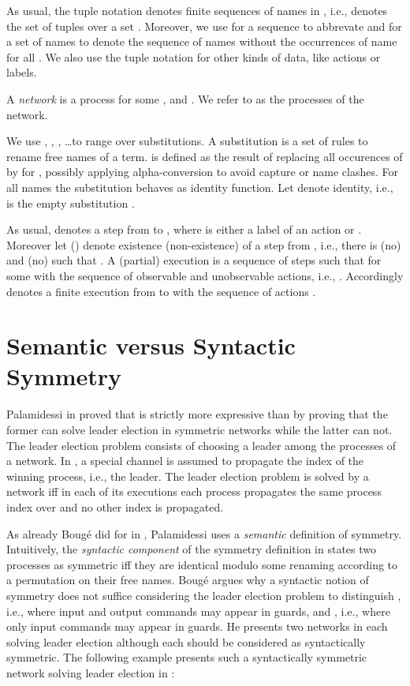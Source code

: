 \documentclass[11pt,techReport]{eptcs}
\begin{document}
As usual, the tuple notation  denotes finite sequences  of names in , i.e.,  denotes the set of tuples over a set . Moreover, we use  for a sequence  to abbrevate  and  for a set of names  to denote the sequence of names  without the occurrences of name  for all . We also use the tuple notation for other kinds of data, like actions or labels.

A \emph{network} is a process  for some ,  and . We refer to  as the processes of the network.

We use , , , \ldots to range over substitutions. A substitution is a set  of rules to rename free names of a term.  is defined as the result of replacing all occurences of  by  for , possibly applying alpha-conversion to avoid capture or name clashes. For all names  the substitution behaves as identity function. Let  denote identity, i.e.,  is the empty substitution .

As usual,  denotes a step from  to , where  is either a label of an action or . Moreover let  () denote existence (non-existence) of a step from , i.e., there is (no)  and (no)  such that . A (partial) execution is a sequence of steps  such that  for some  with the sequence  of observable and unobservable actions, i.e., . Accordingly  denotes a finite execution from  to  with the sequence of actions .




\section{Semantic versus Syntactic Symmetry} \label{sec:SemanticVsSyntactic}

Palamidessi in \cite{palamidessi03} proved that \pimix is strictly more expressive than \pisep by proving that the former can solve leader election in symmetric networks while the latter can not. The leader election problem consists of choosing a leader among the processes of a network. In \cite{palamidessi03}, a special channel  is assumed to propagate the index of the winning process, i.e., the leader. The leader election problem is solved by a network iff in each of its executions each process propagates the same process index over  and no other index is propagated.

As already Boug\'{e} did for \csp in \cite{bouge88}, Palamidessi uses a \emph{semantic} definition of symmetry.  Intuitively, the \emph{syntactic component} of the symmetry definition in \cite{bouge88, palamidessi03, vigliottiPhillipsPalamidessi07} states two processes as symmetric iff they are identical modulo some renaming according to a permutation  on their free names. Boug\'{e} \cite{bouge88} argues why a syntactic notion of symmetry does not suffice considering the leader election problem to distinguish \cspmix, i.e., \csp where input and output commands may appear in guards, and \cspin, i.e., \csp where only input commands may appear in guards. He presents two networks in \cspin each solving leader election although each should be considered as syntactically symmetric. The following example presents such a syntactically symmetric network solving leader election in \pisep:
\end{document}
